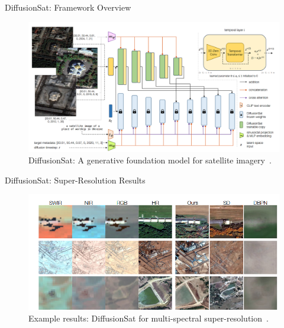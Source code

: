 \begin{refsection}
\begin{frame}{DiffusionSat: Framework Overview}
  \begin{figure}
    \centering
    \includegraphics[width=0.9\linewidth]{figs/diffusionsat.png}
    \caption[]{\scriptsize DiffusionSat: A generative foundation model for satellite imagery~\parencite{diffusionset2024}.}
  \end{figure}
  \bottomleftrefs
\end{frame}
\end{refsection}

\begin{refsection}
\begin{frame}{DiffusionSat: Super-Resolution Results}
  \begin{figure}
    \centering
    \includegraphics[width=0.9\linewidth]{figs/diffusionsat_sr_results.png}
    \caption[]{\scriptsize Example results: DiffusionSat for multi-spectral super-resolution~\parencite{diffusionset2024}.}
  \end{figure}
  \bottomleftrefs
\end{frame}
\end{refsection}

